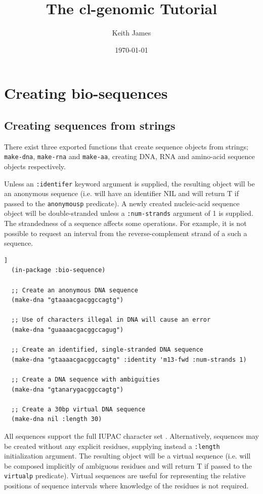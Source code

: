 \documentclass[a4paper, 12pt]{article}
\begin{document}
\title{The cl-genomic Tutorial}
\author{Keith James}
\date{\today}

\maketitle


\section{Creating bio-sequences}
\label{sec:creating-bioseq}

\subsection{Creating sequences from strings}
\label{sec:create-bioseq-str}

There exist three exported functions that create sequence objects from
strings; \lstinline!make-dna!, \lstinline!make-rna! and
\lstinline!make-aa!, creating DNA, RNA and amino-acid sequence objects
respectively.

Unless an \lstinline!:identifer! keyword argument is supplied, the
resulting object will be an anonymous sequence (i.e. will have an
identifier NIL and will return T if passed to the
\lstinline!anonymousp! predicate). A newly created nucleic-acid
sequence object will be double-stranded unless a
\lstinline!:num-strands! argument of 1 is supplied. The strandedness
of a sequence affects some operations. For example, it is not possible
to request an interval from the reverse-complement strand of a such a
sequence.

\begin{lstlisting}[caption={Making DNA sequences from strings},
  label=lst:make-dnaseq-string,float=[tbph]]
  (in-package :bio-sequence)
  
  ;; Create an anonymous DNA sequence
  (make-dna "gtaaaacgacggccagtg")
  
  ;; Use of characters illegal in DNA will cause an error
  (make-dna "guaaaacgacggccagug")

  ;; Create an identified, single-stranded DNA sequence 
  (make-dna "gtaaaacgacggccagtg" :identity 'm13-fwd :num-strands 1)

  ;; Create a DNA sequence with ambiguities
  (make-dna "gtanarygacggccagtg")

  ;; Create a 30bp virtual DNA sequence
  (make-dna nil :length 30)
\end{lstlisting}

All sequences support the full IUPAC character set
\cite{PMID:2582368}. Alternatively, sequences may be created without
any explicit residues, supplying instead a \lstinline!:length!
initialization argument. The resulting object will be a virtual
sequence (i.e. will be composed implicitly of ambiguous residues and
will return T if passed to the \lstinline!virtualp!
predicate). Virtual sequences are useful for representing the relative
positions of sequence intervals where knowledge of the residues is not
required.
\end{document}
